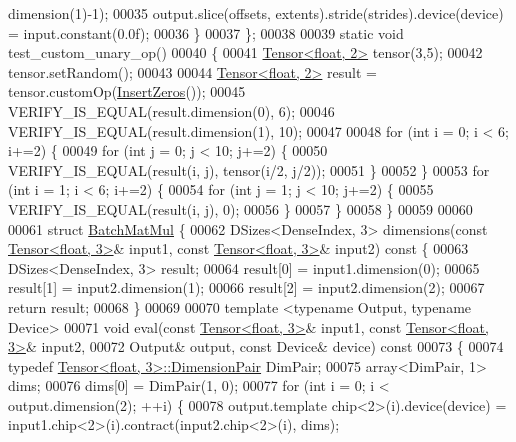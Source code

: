 \begin{DoxyCode}
      dimension(1)-1);
00035     output.slice(offsets, extents).stride(strides).device(device) = input.constant(0.0f);
00036   \}
00037 \};
00038 
00039 \textcolor{keyword}{static} \textcolor{keywordtype}{void} test\_custom\_unary\_op()
00040 \{
00041   \hyperlink{class_eigen_1_1_tensor}{Tensor<float, 2>} tensor(3,5);
00042   tensor.setRandom();
00043 
00044   \hyperlink{class_eigen_1_1_tensor}{Tensor<float, 2>} result = tensor.customOp(\hyperlink{struct_insert_zeros}{InsertZeros}());
00045   VERIFY\_IS\_EQUAL(result.dimension(0), 6);
00046   VERIFY\_IS\_EQUAL(result.dimension(1), 10);
00047 
00048   \textcolor{keywordflow}{for} (\textcolor{keywordtype}{int} i = 0; i < 6; i+=2) \{
00049     \textcolor{keywordflow}{for} (\textcolor{keywordtype}{int} j = 0; j < 10; j+=2) \{
00050       VERIFY\_IS\_EQUAL(result(i, j), tensor(i/2, j/2));
00051     \}
00052   \}
00053   \textcolor{keywordflow}{for} (\textcolor{keywordtype}{int} i = 1; i < 6; i+=2) \{
00054     \textcolor{keywordflow}{for} (\textcolor{keywordtype}{int} j = 1; j < 10; j+=2) \{
00055       VERIFY\_IS\_EQUAL(result(i, j), 0);
00056     \}
00057   \}
00058 \}
00059 
00060 
00061 \textcolor{keyword}{struct }\hyperlink{struct_batch_mat_mul}{BatchMatMul} \{
00062   DSizes<DenseIndex, 3> dimensions(\textcolor{keyword}{const} \hyperlink{class_eigen_1_1_tensor}{Tensor<float, 3>}& input1, \textcolor{keyword}{const} 
      \hyperlink{class_eigen_1_1_tensor}{Tensor<float, 3>}& input2)\textcolor{keyword}{ const }\{
00063     DSizes<DenseIndex, 3> result;
00064     result[0] = input1.dimension(0);
00065     result[1] = input2.dimension(1);
00066     result[2] = input2.dimension(2);
00067     \textcolor{keywordflow}{return} result;
00068   \}
00069 
00070   \textcolor{keyword}{template} <\textcolor{keyword}{typename} Output, \textcolor{keyword}{typename} Device>
00071   \textcolor{keywordtype}{void} eval(\textcolor{keyword}{const} \hyperlink{class_eigen_1_1_tensor}{Tensor<float, 3>}& input1, \textcolor{keyword}{const} 
      \hyperlink{class_eigen_1_1_tensor}{Tensor<float, 3>}& input2,
00072             Output& output, \textcolor{keyword}{const} Device& device)\textcolor{keyword}{ const}
00073 \textcolor{keyword}{  }\{
00074     \textcolor{keyword}{typedef} \hyperlink{class_eigen_1_1_tensor}{Tensor<float, 3>::DimensionPair} DimPair;
00075     array<DimPair, 1> dims;
00076     dims[0] = DimPair(1, 0);
00077     \textcolor{keywordflow}{for} (\textcolor{keywordtype}{int} i = 0; i < output.dimension(2); ++i) \{
00078       output.template chip<2>(i).device(device) = input1.chip<2>(i).contract(input2.chip<2>(i), dims);

\end{DoxyCode}
